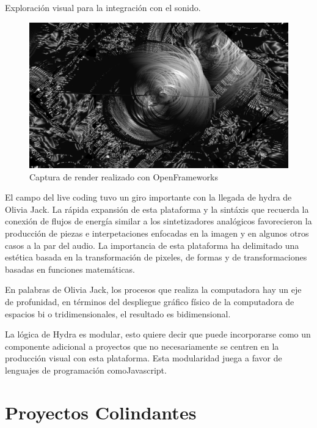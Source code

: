 Exploración visual para la integración con el sonido.  

\begin{figure}[tb]
\centering 
\includegraphics[width=\columnwidth]{img/of13.png} 
\caption[Openframeworks 1]{Captura de render realizado con OpenFrameworks} %
\label{fig:gallery} 
\end{figure}

El campo del live coding tuvo un giro importante con la llegada de hydra de Olivia Jack. La rápida expansión de esta plataforma y la sintáxis que recuerda la conexión de flujos de energía similar a los sintetizadores analógicos favorecieron la producción de piezas e interpetaciones enfocadas en la imagen y en algunos otros casos a la par del audio. La importancia de esta plataforma ha delimitado una estética  basada en  la transformación de pixeles, de formas y de transformaciones basadas en funciones matemáticas.

En palabras de Olivia Jack, los procesos que realiza la computadora hay un eje de profunidad, en términos del despliegue gráfico físico de la computadora de espacios bi o tridimensionales, el resultado es bidimensional.

La lógica de Hydra es modular, esto quiere decir que puede incorporarse como un componente adicional a proyectos que no necesariamente se centren en la producción visual con esta plataforma. Esta modularidad juega a favor de lenguajes de programación comoJavascript. 

\section{Proyectos Colindantes}

